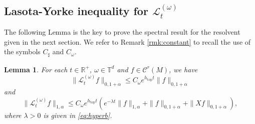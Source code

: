 \documentclass[11pt,letterpaper]{amsart}
\newcommand \cL {{\mathcal L}}
\newcommand \R {{ \mathbb R}}
\newcommand \T {{ \mathbb T}}
\newcommand \cC {{\mathscr{C}}}
\newcommand \sC {{C_\sharp}}
\DeclareMathOperator{\topp}{top}
\newtheorem {lemma}[theorem]{Lemma}
\theoremstyle{definition}
\begin{document}

\subsection{Lasota-Yorke inequality for $\cL^{(\omega)}_t$} The following Lemma is the key to prove the spectral result for the resolvent given in the next section. We refer to Remark \ref{rmk:constant} to recall the use of the symbols $\sC$ and $C_{\omega}$. 

\begin{lemma}\label{lem:LY-L}
For each $t\in \R^+$, $\omega \in \T^d$ and $f\in \cC^r(M)$, we have 
\begin{equation}\label{eq:LY1-L}
\|\cL^{(\omega)}_t f\|_{0,1+\alpha} \le C_\omega e^{h_{\topp}t}\|f\|_{0,1+\alpha}
\end{equation}
and
\begin{equation}\label{eq:LY2-L}
\|\cL^{(\omega)}_t f\|_{1,\alpha} \le  C_\omega e^{h_{\topp}t}(e^{-\lambda t} \|f\|_{1,\alpha} +\|f\|_{0,1+\alpha}+\|Xf\|_{0,1+\alpha}),
\end{equation}
where $\lambda>0$ is given in \eqref{eq:hyperb}.
\end{lemma}
%
\end{document}
